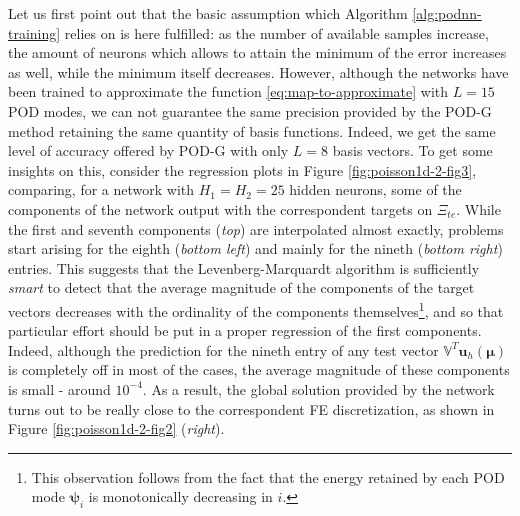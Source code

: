 \documentclass[12pt, a4paper, twoside, openright]{report}
\numberwithin{equation}{chapter}
\theoremstyle{theorem}
\theoremstyle{definition}
\theoremstyle{remark}
\theoremstyle{proposition}
\numberwithin{figure}{chapter}
\newcommand{\bg}[1]{\boldsymbol{#1}}
\begin{document}
		Let us first point out that the basic assumption which Algorithm \ref{alg:podnn-training} relies on is here fulfilled: as the number of available samples increase, the amount of neurons which allows to attain the minimum of the error increases as well, while the minimum itself decreases. However, although the networks have been trained to approximate the function \eqref{eq:map-to-approximate} with $L = 15$ POD modes, we can not guarantee the same precision provided by the POD-G method retaining the same quantity of basis functions. Indeed, we get the same level of accuracy offered by POD-G with only $L = 8$ basis vectors. To get some insights on this, consider the regression plots in Figure \ref{fig:poisson1d-2-fig3}, comparing, for a network with $H_1 = H_2 = 25$ hidden neurons, some of the components of the network output with the correspondent targets on $\Xi_{te}$. While the first and seventh components (\emph{top}) are interpolated almost exactly, problems start arising for the eighth (\emph{bottom left}) and mainly for the nineth (\emph{bottom right}) entries. This suggests that the Levenberg-Marquardt algorithm is sufficiently \emph{smart} to detect that the average magnitude of the components of the target vectors decreases with the ordinality of the components themselves\footnote{This observation follows from the fact that the energy retained by each POD mode $\bg{\psi}_i$ is monotonically decreasing in $i$.}, and so that particular effort should be put in a proper regression of the first components. Indeed, although the prediction for the nineth entry of any test vector $\mathbb{V}^T \mathbf{u}_h(\bg{\mu})$ is completely off in most of the cases, the average magnitude of these components is small - around $10^{-4}$. As a result, the global solution provided by the network turns out to be really close to the correspondent FE discretization, as shown in Figure \ref{fig:poisson1d-2-fig2} (\emph{right}).
		
		\clearpage
				
\end{document}
